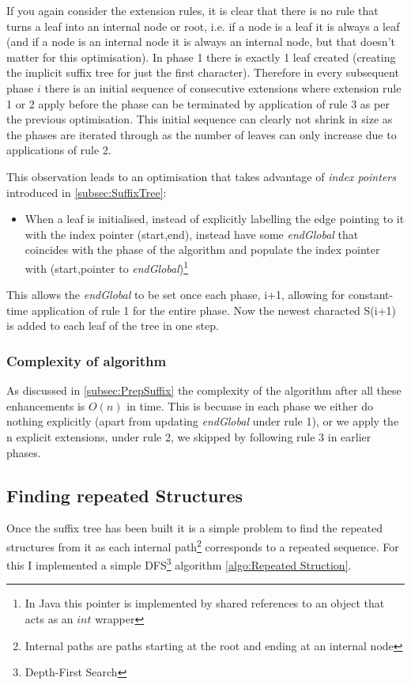 \documentclass[12pt,twoside,notitlepage]{report}
\begin{document}
					If you again consider the extension rules, it is clear that there is no rule that turns a leaf into an internal node or root, i.e. if a node is a leaf it is always a leaf (and if a node is an internal node it is always an internal node, but that doesn't matter for this optimisation). In phase 1 there is exactly 1 leaf created (creating the implicit suffix tree for just the first character). Therefore in every subsequent phase $i$ there is an initial sequence of consecutive extensions where extension rule 1 or 2 apply before the phase can be terminated by application of rule 3 as per the previous optimisation. This initial sequence can clearly not shrink in size as the phases are iterated through as the number of leaves can only increase due to applications of rule 2. 
					
					This observation leads to an optimisation that takes advantage of \emph{index pointers} introduced in \ref{subsec:SuffixTree}:
					\begin{itemize}
						\item{When a leaf is initialised, instead of explicitly labelling the edge pointing to it with the index pointer (start,end), instead have some \emph{endGlobal} that coincides with the phase of the algorithm and populate the index pointer with (start,pointer to \emph{endGlobal})\footnote{In Java this pointer is implemented by shared references to an object that acts as an $int$ wrapper}}
					\end{itemize}
					This allows the \emph{endGlobal} to be set once each phase, i+1, allowing for constant-time application of rule 1 for the entire phase. Now the newest characted S(i+1) is added to each leaf of the tree in one step.
					
					\subsubsection{Complexity of algorithm}
					As discussed in \ref{subsec:PrepSuffix} the complexity of the algorithm after all these enhancements is $O(n)$ in time. This is becuase in each phase we either do nothing explicitly (apart from updating \emph{endGlobal} under rule 1), or we apply the n explicit extensions, under rule 2, we skipped by following rule 3 in earlier phases.
					
					
			\subsection{Finding repeated Structures}\label{subsec:Finding repeated Structures}
			Once the suffix tree has been built it is a simple problem to find the repeated structures from it as each internal path\footnote{Internal paths are paths starting at the root and ending at an internal node} corresponds to a repeated sequence. For this I implemented a simple DFS\footnote{Depth-First Search} algorithm \ref{algo:Repeated Struction}.
			
\end{document}
